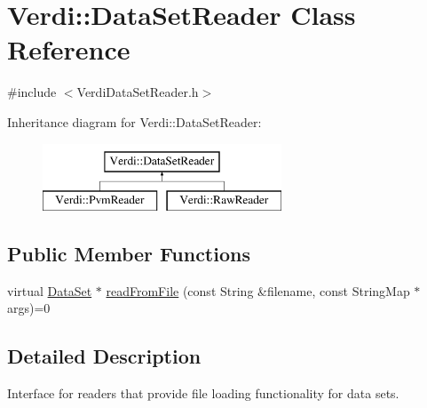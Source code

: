 \hypertarget{class_verdi_1_1_data_set_reader}{\section{\-Verdi\-:\-:\-Data\-Set\-Reader \-Class \-Reference}
\label{class_verdi_1_1_data_set_reader}
}


{\ttfamily \#include $<$\-Verdi\-Data\-Set\-Reader.\-h$>$}

\-Inheritance diagram for \-Verdi\-:\-:\-Data\-Set\-Reader\-:\begin{figure}[H]
\begin{center}
\leavevmode
\includegraphics[height=2.000000cm]{class_verdi_1_1_data_set_reader}
\end{center}
\end{figure}
\subsection*{\-Public \-Member \-Functions}
\begin{DoxyCompactItemize}
\item 
virtual \hyperlink{class_verdi_1_1_data_set}{\-Data\-Set} $\ast$ \hyperlink{class_verdi_1_1_data_set_reader_a46bc06b41075b8d1d38276e816227994}{read\-From\-File} (const \-String \&filename, const \-String\-Map $\ast$args)=0
\end{DoxyCompactItemize}


\subsection{\-Detailed \-Description}
\-Interface for readers that provide file loading functionality for data sets. 

